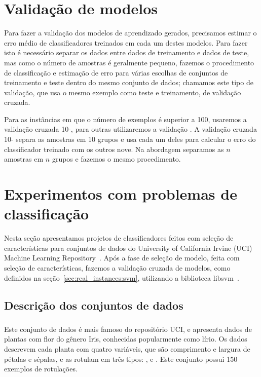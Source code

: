 \section{Validação de modelos}
Para fazer a validação dos modelos de aprendizado gerados, precisamos
estimar o erro médio de classificadores treinados em cada um destes
modelos. Para fazer isto é necessário separar os dados entre dados de
treinamento e dados de teste, mas como o número de amostras é geralmente
pequeno, fazemos o procedimento de classificação e estimação de erro
para várias escolhas de conjuntos de treinamento e teste dentro do 
mesmo conjunto de dados; chamamos este tipo de validação, que usa o 
mesmo exemplo como teste e treinamento, de validação cruzada.

Para as instâncias em que o número de exemplos é superior a 100, 
usaremos a validação cruzada 10-, para outras 
utilizaremos a validação . A validação
cruzada 10- separa as amostras em 10 grupos e usa
cada um deles para calcular o erro do classificador treinado com os 
outros nove. Na abordagem  separamos as
$n$ amostras em $n$ grupos e fazemos o mesmo procedimento.

\section{Experimentos com problemas de classificação}
Nesta seção apresentamos projetos de classificadores feitos
com seleção de características para conjuntos de dados do University of 
California Irvine (UCI) Machine Learning Repository~\cite{Lic13}. Após 
a fase de seleção de modelo, feita com seleção de características, 
fazemos a validação cruzada de modelos, como definidos na 
seção~\ref{sec:real_instances:svm}, utilizando a biblioteca 
libsvm~\cite{CL11}.

\subsection{Descrição dos conjuntos de dados}
\subsubsection{}
Este conjunto de dados é mais famoso do repositório UCI, e apresenta 
dados de plantas com flor do gênero Iris, conhecidas popularmente como 
lírio. Os dados descrevem cada planta com quatro variáveis, que são 
comprimento e largura de pétalas e sépalas, e as rotulam em três tipos:
,  e 
. Este conjunto possui 150 exemplos de 
rotulações.

